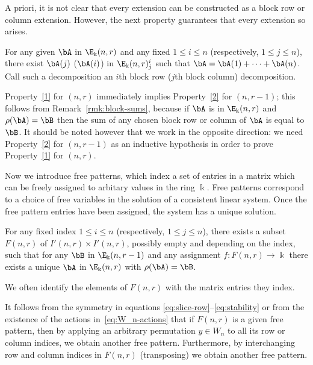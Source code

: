 A priori, it is not clear that every extension can be constructed as a
block row or column extension. However, the next property guarantees
that every extension so arises.

\begin{property}\label{2}
 For any given $\bA$ in $\E_\Bbbk(n,r)$ and any fixed $1\le i \le n$
 \textup{(}respectively, $1 \le j \le n$\textup{)}, there exist
 $\bA(j)$ \textup{(}\resp $\bA(i)$\textup{)} in $\E_\Bbbk(n,r)^i_j$
 such that $\bA = \bA(1) + \cdots + \bA(n)$. Call such a
 decomposition an $i$th block row \textup{(}\resp $j$th block
 column\textup{)} decomposition.
\end{property}

Property~\ref{1} for $(n,r)$ immediately implies Property~\ref{2} for
$(n,r-1)$; this follows from Remark~\ref{rmk:block-sums}, because if
$\bA$ is in $\E_\Bbbk(n,r)$ and $\rho(\bA)=\bB$ then the sum of any
chosen block row or column of $\bA$ is equal to $\bB$. It should be
noted however that we work in the opposite direction: we need
Property~\ref{2} for $(n,r-1)$ as an inductive hypothesis in order to
prove Property~\ref{1} for $(n,r)$.

Now we introduce free patterns, which index a set of entries in a
matrix which can be freely assigned to arbitary values in the ring
$\Bbbk$. Free patterns correspond to a choice of free variables in
the solution of a consistent linear system. Once the free pattern
entries have been assigned, the system has a unique solution. 


\begin{property}\label{3}
 For any fixed index $1\le i \le n$ \textup{(}respectively, $1 \le j
 \le n$\textup{)}, there exists a subset $F(n,r)$ of $I'(n,r) \times
 I'(n,r)$, possibly empty and depending on the index, such that for
 any $\bB$ in $\E_\Bbbk(n,r-1)$ and any assignment $f: F(n,r) \to
 \Bbbk$ there exists a unique $\bA$ in $\E_\Bbbk(n,r)$ with
 $\rho(\bA) = \bB$.
\end{property}


\begin{rema}
We often identify the elements of $F(n,r)$ with the matrix entries
they index. 
\end{rema}


It follows from the symmetry in equations
\eqref{eq:slice-row}--\eqref{eq:stability} or from the existence of
the actions in~\eqref{eq:W_n-actions} that if $F(n,r)$ is a given free
pattern, then by applying an arbitrary permutation $y\in W_n$ to all
its row or column indices, we obtain another free
pattern. Furthermore, by interchanging row and column indices in
$F(n,r)$ (transposing) we obtain another free pattern.

